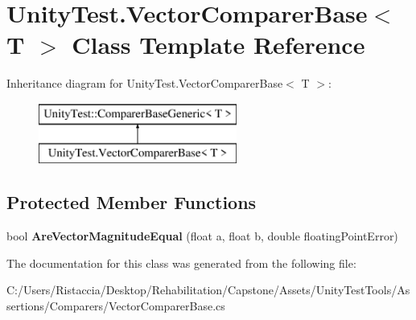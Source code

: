 \hypertarget{class_unity_test_1_1_vector_comparer_base}{}\section{Unity\+Test.\+Vector\+Comparer\+Base$<$ T $>$ Class Template Reference}
\label{class_unity_test_1_1_vector_comparer_base}
Inheritance diagram for Unity\+Test.\+Vector\+Comparer\+Base$<$ T $>$\+:\begin{figure}[H]
\begin{center}
\leavevmode
\includegraphics[height=2.000000cm]{class_unity_test_1_1_vector_comparer_base}
\end{center}
\end{figure}
\subsection*{Protected Member Functions}
\begin{DoxyCompactItemize}
\item 
\mbox{\label{class_unity_test_1_1_vector_comparer_base_a2b09a6a31ab890b3b77d7659c100bd3a}} 
bool {\bfseries Are\+Vector\+Magnitude\+Equal} (float a, float b, double floating\+Point\+Error)
\end{DoxyCompactItemize}


The documentation for this class was generated from the following file\+:\begin{DoxyCompactItemize}
\item 
C\+:/\+Users/\+Ristaccia/\+Desktop/\+Rehabilitation/\+Capstone/\+Assets/\+Unity\+Test\+Tools/\+Assertions/\+Comparers/Vector\+Comparer\+Base.\+cs\end{DoxyCompactItemize}
